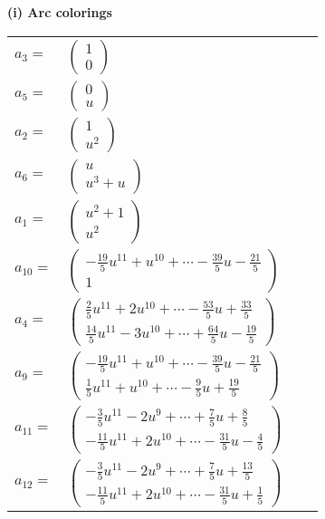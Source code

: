 \documentclass[1p]{elsarticle_modified}
\theoremstyle{definition}
\begin{document}
\flushleft \textbf{(i) Arc colorings}\\
\begin{tabular}{m{7pt} m{180pt} m{7pt} m{180pt} }
\flushright $a_{3}=$&$\begin{pmatrix}1\\0\end{pmatrix}$ \\
\flushright $a_{5}=$&$\begin{pmatrix}0\\u\end{pmatrix}$ \\
\flushright $a_{2}=$&$\begin{pmatrix}1\\u^2\end{pmatrix}$ \\
\flushright $a_{6}=$&$\begin{pmatrix}u\\u^3+u\end{pmatrix}$ \\
\flushright $a_{1}=$&$\begin{pmatrix}u^2+1\\u^2\end{pmatrix}$ \\
\flushright $a_{10}=$&$\begin{pmatrix}-\frac{19}{5} u^{11}+u^{10}+\cdots-\frac{39}{5} u-\frac{21}{5}\\1\end{pmatrix}$ \\
\flushright $a_{4}=$&$\begin{pmatrix}\frac{2}{5} u^{11}+2 u^{10}+\cdots-\frac{53}{5} u+\frac{33}{5}\\\frac{14}{5} u^{11}-3 u^{10}+\cdots+\frac{64}{5} u-\frac{19}{5}\end{pmatrix}$ \\
\flushright $a_{9}=$&$\begin{pmatrix}-\frac{19}{5} u^{11}+u^{10}+\cdots-\frac{39}{5} u-\frac{21}{5}\\\frac{1}{5} u^{11}+u^{10}+\cdots-\frac{9}{5} u+\frac{19}{5}\end{pmatrix}$ \\
\flushright $a_{11}=$&$\begin{pmatrix}-\frac{3}{5} u^{11}-2 u^9+\cdots+\frac{7}{5} u+\frac{8}{5}\\-\frac{11}{5} u^{11}+2 u^{10}+\cdots-\frac{31}{5} u-\frac{4}{5}\end{pmatrix}$ \\
\flushright $a_{12}=$&$\begin{pmatrix}-\frac{3}{5} u^{11}-2 u^9+\cdots+\frac{7}{5} u+\frac{13}{5}\\-\frac{11}{5} u^{11}+2 u^{10}+\cdots-\frac{31}{5} u+\frac{1}{5}\end{pmatrix}$ \\

\end{tabular}
\end{document}
